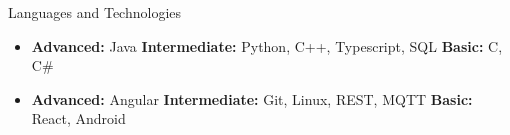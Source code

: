 \documentclass[]{style}
\begin{document}
	\begin{cvsection}{Languages and Technologies}
		\begin{cvsubsection}{}{}{}	
			\begin{itemize}
				\item \textbf{Advanced:} Java \textbf{Intermediate:} Python, C++, Typescript, SQL \textbf{Basic:} C, C\# 
				\item \textbf{Advanced:} Angular \textbf{Intermediate:} Git, Linux, REST, MQTT \textbf{Basic:} React, Android
			\end{itemize}
		\end{cvsubsection}
	\end{cvsection}
	
\end{document}
